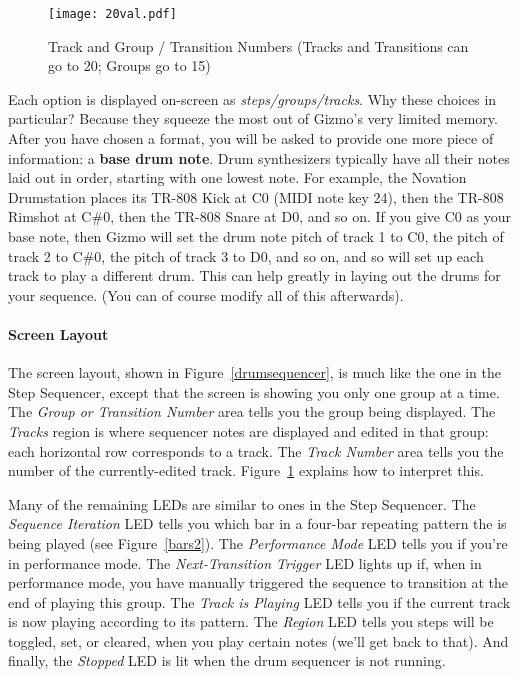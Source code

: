 \documentclass{article}
\begin{document}
\begin{figure}
\vspace{-1em}
\texttt{[image: 20val.pdf]}
\vspace{-1em}\caption{\small Track and Group / Transition Numbers (Tracks and Transitions can go to 20; Groups go to 15)}
\vspace{-2em}
\label{trackgrouptransitionnumber}
\end{figure}

\vspace{1em}Each option is displayed on-screen as {\it steps/groups/tracks}.  Why these choices in particular? Because they squeeze the most out of Gizmo's very limited memory.   After you have chosen a format, you will be asked to provide one more piece of information: a {\bf base drum note}.  Drum synthesizers typically have all their notes laid out in order, starting with one lowest note.  For example, the Novation Drumstation places its TR-808 Kick at C0 (MIDI note key 24), then the TR-808 Rimshot at C\#0, then the TR-808 Snare at D0, and so on.  If you give C0 as your base note, then Gizmo will set the drum note pitch of track 1 to C0, the pitch of track 2 to C\#0, the pitch of track 3 to D0, and so on, and so will set up each track to play a different drum. This can help greatly in laying out the drums for your sequence.  (You can of course modify all of this afterwards).

\paragraph{Screen Layout} The screen layout, shown in Figure~\ref{drumsequencer}, is much like the one in the Step Sequencer, except that the screen is showing you only one group at a time.  The {\it Group or Transition Number} area tells you the group being displayed.  The {\it Tracks} region is where sequencer notes are displayed and edited in that group: each horizontal row corresponds to a track.  The {\it Track Number} area tells you the number of the currently-edited track.  Figure~\ref{trackgrouptransitionnumber} explains how to interpret this.

Many of the remaining LEDs are similar to ones in the Step Sequencer.  The {\it Sequence Iteration} LED tells you which bar in a four-bar repeating pattern the is being played (see Figure~\ref{bars2}).  The {\it Performance Mode} LED tells you if you're in performance mode.  The {\it Next-Transition Trigger} LED lights up if, when in performance mode, you have manually triggered the sequence to transition at the end of playing this group.  The {\it Track is Playing} LED tells you if the current track is now playing according to its pattern.  The {\it Region} LED tells you steps will be toggled, set, or cleared, when you play certain notes (we'll get back to that). And finally, the {\it Stopped} LED is lit when the drum sequencer is not running.
\end{document}
